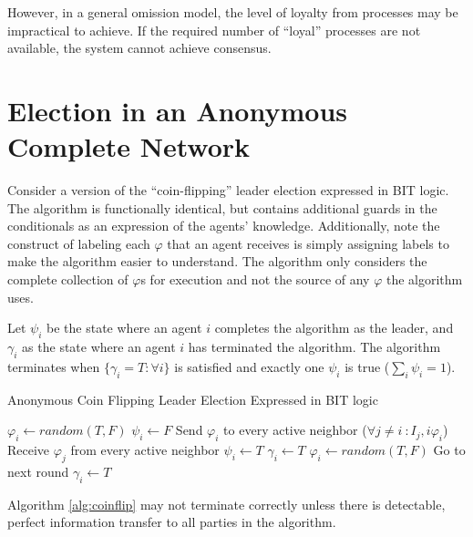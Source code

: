 However, in a general omission model, the level of loyalty from processes may be impractical to achieve.
If the required number of ``loyal'' processes are not available, the system cannot achieve consensus.

\section{Election in an Anonymous Complete Network}

Consider a version of the ``coin-flipping'' leader election expressed in BIT logic.
The algorithm is functionally identical, but contains additional guards in the conditionals as an expression of the agents' knowledge.
Additionally, note the construct of labeling each $\varphi$ that an agent receives is simply assigning labels to make the algorithm easier to understand.
The algorithm only considers the complete collection of $\varphi$s for execution and not the source of any $\varphi$ the algorithm uses.

Let $\psi_i$ be the state where an agent $i$ completes the algorithm as the leader, and $\gamma_i$ as the state where an agent $i$ has terminated the algorithm.
The algorithm terminates when $\{\gamma_i = T : \forall i \}$ is satisfied and exactly one $\psi_i$ is true ($\sum_i \psi_i = 1$).

\begin{algorithm}
\caption{Anonymous Coin Flipping Leader Election Expressed in BIT logic}
\label{alg:coinflip}
\begin{algorithmic}[1]
\small
\State $\varphi_i \gets random(T,F)$
\State $\psi_i \gets F$
\State Send $\varphi_i$ to every active neighbor ($\forall j \neq i\ : I_j,i \varphi_i$)
\State Receive $\varphi_j$ from every active neighbor 
	\State $\psi_i \gets T$
	\State $\gamma_i \gets T$
	\State $\varphi_i \gets random(T,F)$
	\State Go to next round
	\State $\gamma_i \gets T$
\EndIf
\end{algorithmic}
\end{algorithm}

\begin{thm}
Algorithm \ref{alg:coinflip} may not terminate correctly unless there is detectable, perfect information transfer to all parties in the algorithm.
\end{thm}

